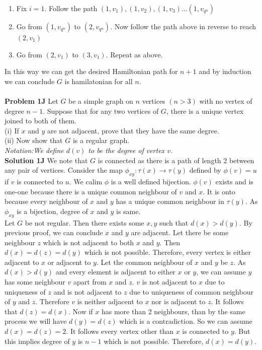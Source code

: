\documentclass{book}
\begin{document}
\begin{enumerate}
	\item Fix $i=1$. Follow the path  $(1,v_1),(1,v_2),(1,v_3)\hdots (1,v_{q^n})$
	\item Go from $(1,v_{q^n})$ to $(2,v_{q^n})$. Now follow the path above in reverse to reach $(2,v_1)$
	\item Go from $(2,v_1)$ to $(3,v_1)$. Repeat as above. 
\end{enumerate}
In this way we can get the desired Hamiltonian path for $n+1$ and by induction we can conclude $G$ is hamilatonian for all $n$. \\\\
\textbf{Problem 1J} Let $G$ be a simple graph on $n$ vertices $(n > 3)$ with
no vertex of degree $n - 1$. Suppose that for any two vertices of $G$,
there is a unique vertex joined to both of them.\\
(i) If $x$ and $y$ are not adjacent, prove that they have the same
degree.\\
(ii) Now show that $G$ is a regular graph.\\
\textit{Notation:We define $d(v)$ to be the degree of vertex $v$. }\\
\textbf{Solution 1J} We note that $G$ is connected as there is a path of length 2 between any pair of vertices. Consider the map $\phi_{xy}:\tau(x)\to\tau(y)$ defined by $\phi(v)=u$ if $v$ is connected to $u$. We calim $\phi$ is a well defined bijection. $\phi(v)$ exists and is one-one because there is a unique common neighbour of $v$ and $x$. It is onto because every neighbour of $x$ and $y$ has a unique common neighbour in $\tau(y)$. As $\phi_{xy}$ is a bijection, degree of $x$ and $y$ is same.\\
 Let $G$ be not regular. Then there exists some $x,y$ such that $d(x)>d(y)$. By previous proof, we can conclude $x$ and $y$ are adjacent. Let there be some neighbour $z$ which is not adjacent to both $x$ and $y$. Then $d(x)=d(z)=d(y)$ which is not possible. Therefore, every vertex is either adjacent to $x$ or adjacent to $y$.  Let the common neighbour of $x$ and $y$ be $z$. As $d(x)>d(y)$ and every element is adjacent to either $x$ or $y$, we can assume $y$ has some neighbour $v$ apart from $x$ and $z$. $v$ is not adjacent to $x$ due to uniqueness of $z$ and is not adjacent to $z$ due to uniqueness of common neighbour of $y$ and $z$. Therefore $v$ is neither adjacent to $x$ nor is adjacent to $z$. It follows that $d(z)=d(x)$. Now if $x$ has more than 2 neighbours, than by the same process we will have $d(y)=d(z)$ which is a contradiction. So we can assume $d(x)=d(z)=2$. It follows every vertex other than $x$ is connected to $y$. But this implies degree of $y$ is $n-1$ which is not possible. Therefore, $d(x)=d(y)$. 
\end{document}
